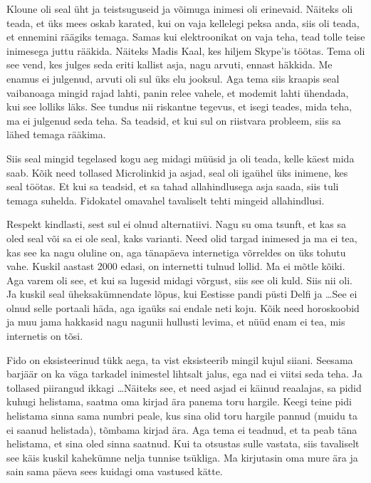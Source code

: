 Kloune oli seal üht ja teistsuguseid ja võimuga inimesi oli erinevaid. Näiteks  oli teada, et üks mees oskab karated, kui on vaja kellelegi peksa anda, siis oli teada, et ennemini räägiks temaga. Samas kui elektroonikat on vaja teha, tead tolle teise inimesega juttu rääkida. Näiteks Madis Kaal, kes hiljem Skype'is töötas. Tema oli see vend, kes julges seda eriti kallist asja, nagu arvuti, ennast häkkida. Me enamus ei julgenud, arvuti oli sul üks elu jooksul. Aga tema siis kraapis seal vaibanoaga mingid rajad lahti, panin relee vahele, et modemit lahti ühendada, kui see lolliks läks. See tundus nii riskantne tegevus, et isegi teades, mida teha, ma ei julgenud seda teha. Sa teadsid, et kui sul on riistvara probleem, siis sa lähed temaga rääkima. 

Siis seal mingid tegelased kogu aeg midagi müüsid ja oli teada, kelle käest mida saab. Kõik need tollased Microlinkid ja asjad,  seal oli igaühel  üks inimene, kes seal töötas. Et kui sa teadsid, et sa tahad allahindlusega asja saada,  siis tuli temaga suhelda. Fidokatel omavahel tavaliselt tehti mingeid allahindlusi. 


Respekt kindlasti, sest sul ei olnud alternatiivi. Nagu su oma tsunft, et kas sa oled seal või sa ei ole seal, kaks varianti. Need olid targad inimesed ja ma ei tea, kas see  ka nagu oluline on, aga tänapäeva internetiga võrreldes on üks tohutu vahe. Kuskil aastast 2000 edasi, on internetti tulnud lollid. Ma ei mõtle kõiki. Aga varem oli see, et kui sa lugesid midagi võrgust, siis see oli kuld. Siis nii oli. Ja kuskil seal üheksakümnendate lõpus, kui Eestisse pandi püsti Delfi ja \ldots See ei olnud  selle portaali häda, aga igaüks sai endale neti koju. Kõik need horoskoobid ja muu jama hakkasid nagu nagunii hullusti levima, et nüüd enam ei tea, mis internetis on tõsi. 


Fido on eksisteerinud  tükk aega, ta vist eksisteerib mingil kujul siiani. Seesama barjäär on ka väga tarkadel inimestel lihtsalt jalus, ega nad ei viitsi seda teha. Ja tollased piirangud ikkagi \ldots Näiteks see, et need asjad ei käinud reaalajas, sa pidid kuhugi helistama, saatma oma kirjad ära panema toru hargile. Keegi teine pidi helistama sinna sama numbri peale, kus sina olid toru hargile pannud (muidu ta ei saanud helistada), tõmbama kirjad ära. Aga tema ei teadnud, et ta peab täna helistama, et sina oled sinna saatnud. Kui ta otsustas sulle vastata, siis tavaliselt see käis kuskil kahekümne nelja tunnise tsükliga. Ma kirjutasin oma mure ära ja sain sama päeva sees kuidagi oma vastused kätte. 

